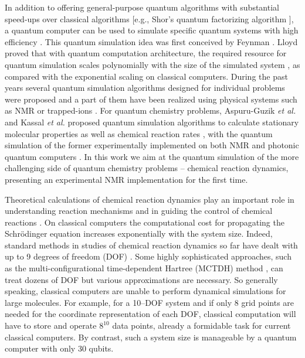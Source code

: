 \documentclass[twocolumn,showpacs,twoside,10pt,prl]{revtex4}
\begin{document}
In addition to offering general-purpose quantum algorithms with substantial speed-ups over classical algorithms \cite{Nielsen}
[e.g., Shor's quantum factorizing algorithm \cite{Shor}], a quantum computer can be used to simulate
specific quantum systems with high efficiency \cite{Buluta}.
This quantum simulation idea was first conceived by Feynman \cite{Feynman}.
Lloyd proved that with quantum computation architecture,
the required resource for quantum simulation scales polynomially
with the size of the simulated system \cite{Lloyd}, as compared with the exponential scaling on  classical computers.
During the past years several quantum simulation algorithms designed for individual problems were
proposed \cite{Zalka,Abrams,Wu,Smirnov,Lidar} and a part of them have been realized
using physical systems such as NMR \cite{Peng,Somaroo,Negrevergne} or trapped-ions \cite{Friedenauer}.
For quantum chemistry problems, Aspuru-Guzik {\it et al.} and Kassal {\it et al.} proposed quantum simulation algorithms
to calculate stationary molecular properties \cite{static} as well as chemical reaction rates \cite{dynamical}, with the quantum simulation
of the former experimentally implemented on both
NMR \cite{static_exp2} and photonic quantum computers \cite{static_exp1}.
In this work we aim at the quantum simulation of the more challenging side of quantum chemistry problems -- chemical reaction dynamics,
presenting an experimental NMR implementation for the first time.

Theoretical calculations of chemical reaction dynamics
play an important role in understanding reaction mechanisms and in guiding
the control of chemical reactions \cite{rabitz,rice-brumer}. On classical computers
the computational cost for propagating the Schr\"{o}dinger equation
increases exponentially with the system size.
Indeed, standard methods in studies of chemical reaction dynamics
so far have dealt with up to 9 degrees of freedom (DOF) \cite{ninedegree}.
Some highly sophisticated approaches,
such as the multi-configurational time-dependent Hartree (MCTDH) method \cite{mctdh},
can treat dozens of DOF but various approximations are necessary.
So generally speaking, classical computers are unable to perform dynamical simulations for large molecules.
For example, for a 10--DOF system
and if only 8 grid points are needed for the coordinate representation of each DOF,
classical computation will have to store and operate $8^{10}$ data points,
already a formidable task for current classical computers.
By contrast, such a system size is manageable by a quantum computer with
only 30 qubits. 
\end{document}
